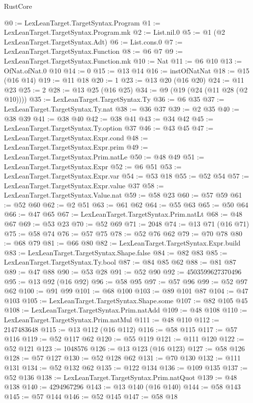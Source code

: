 \begin{lexlean}{RustCore}
\begin{coremodule}
@0 := LexLeanTarget.TargetSyntax.Program
@1 := LexLeanTarget.TargetSyntax.Program.mk
@2 := List.nil.{0}
@5 := @1 (@2 LexLeanTarget.TargetSyntax.Adt)
@6 := List.cons.{0}
@7 := LexLeanTarget.TargetSyntax.Function
@8 := @6 @7
@9 := LexLeanTarget.TargetSyntax.Function.mk
@10 := Nat
@11 := @6 @10
@13 := OfNat.ofNat.{0} @10
@14 := 0
@15 := @13 @14
@16 := instOfNatNat
@18 := @15 (@16 @14)
@19 := @11 @18
@20 := 1
@23 := @13 @20 (@16 @20)
@24 := @11 @23
@25 := 2
@28 := @13 @25 (@16 @25)
@34 := @9 (@19 (@24 (@11 @28 (@2 @10))))
@35 := LexLeanTarget.TargetSyntax.Ty
@36 := @6 @35
@37 := LexLeanTarget.TargetSyntax.Ty.nat
@38 := @36 @37
@39 := @2 @35
@40 := @38 @39
@41 := @38 @40
@42 := @38 @41
@43 := @34 @42
@45 := LexLeanTarget.TargetSyntax.Ty.option @37
@46 := @43 @45
@47 := LexLeanTarget.TargetSyntax.Expr.cond
@48 := LexLeanTarget.TargetSyntax.Expr.prim
@49 := LexLeanTarget.TargetSyntax.Prim.natLe
@50 := @48 @49
@51 := LexLeanTarget.TargetSyntax.Expr
@52 := @6 @51
@53 := LexLeanTarget.TargetSyntax.Expr.var
@54 := @53 @18
@55 := @52 @54
@57 := LexLeanTarget.TargetSyntax.Expr.value @37
@58 := LexLeanTarget.TargetSyntax.Value.nat
@59 := @58 @23
@60 := @57 @59
@61 := @52 @60
@62 := @2 @51
@63 := @61 @62
@64 := @55 @63
@65 := @50 @64
@66 := @47 @65
@67 := LexLeanTarget.TargetSyntax.Prim.natLt
@68 := @48 @67
@69 := @53 @23
@70 := @52 @69
@71 := 2048
@74 := @13 @71 (@16 @71)
@75 := @58 @74
@76 := @57 @75
@78 := @52 @76 @62
@79 := @70 @78
@80 := @68 @79
@81 := @66 @80
@82 := LexLeanTarget.TargetSyntax.Expr.build
@83 := LexLeanTarget.TargetSyntax.Shape.false
@84 := @82 @83
@85 := LexLeanTarget.TargetSyntax.Ty.bool
@87 := @84 @85 @62
@88 := @81 @87
@89 := @47 @88
@90 := @53 @28
@91 := @52 @90
@92 := 4503599627370496
@95 := @13 @92 (@16 @92)
@96 := @58 @95
@97 := @57 @96
@99 := @52 @97 @62
@100 := @91 @99
@101 := @68 @100
@103 := @89 @101 @87
@104 := @47 @103
@105 := LexLeanTarget.TargetSyntax.Shape.some
@107 := @82 @105 @45
@108 := LexLeanTarget.TargetSyntax.Prim.natAdd
@109 := @48 @108
@110 := LexLeanTarget.TargetSyntax.Prim.natMul
@111 := @48 @110
@112 := 2147483648
@115 := @13 @112 (@16 @112)
@116 := @58 @115
@117 := @57 @116
@119 := @52 @117 @62
@120 := @55 @119
@121 := @111 @120
@122 := @52 @121
@123 := 1048576
@126 := @13 @123 (@16 @123)
@127 := @58 @126
@128 := @57 @127
@130 := @52 @128 @62
@131 := @70 @130
@132 := @111 @131
@134 := @52 @132 @62
@135 := @122 @134
@136 := @109 @135
@137 := @52 @136
@138 := LexLeanTarget.TargetSyntax.Prim.natQuot
@139 := @48 @138
@140 := 4294967296
@143 := @13 @140 (@16 @140)
@144 := @58 @143
@145 := @57 @144
@146 := @52 @145
@147 := @58 @18

\end{coremodule}
\end{lexlean}
